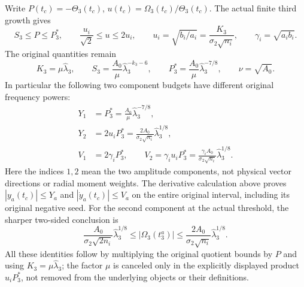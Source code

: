 Write $P(t_c)=-\Theta_3(t_c)$, $u(t_c)=\Omega_3(t_c)/\Theta_3(t_c)$.
The actual finite third growth gives
\[
 S_3\le P\le P_3^*,\qquad
 \frac{u_i}{\sqrt2}\le u\le2u_i,\qquad
 u_i=\sqrt{b_i/a_i}=\frac{K_3}{\sigma_2\sqrt{n_i}},
 \qquad \gamma_i=\sqrt{a_ib_i}.
\]
The original quantities remain
\[
 K_3=\mu\widehat\lambda_3,\qquad
 S_3=\frac{A_0}{\mu}\widehat\lambda_3^{-k_3-6},\qquad
 P_3^*=\frac{A_0}{\mu}\widehat\lambda_3^{-7/8},\qquad
 \nu=\sqrt{A_0}.
\]
In particular the following two component budgets have different
original frequency powers:
\begin{equation}
 \begin{split}
 Y_1&=P_3^*=\frac{A_0}{\mu}\widehat\lambda_3^{-7/8},\\
 Y_2&=2u_iP_3^*
      =\frac{2A_0}{\sigma_2\sqrt{n_i}}\widehat\lambda_3^{1/8},\\
 V_1&=2\gamma_iP_3^*,\qquad
 V_2=\gamma_i u_iP_3^*
      =\frac{\gamma_i A_0}{\sigma_2\sqrt{n_i}}
                       \widehat\lambda_3^{1/8}.
 \end{split}\label{tgq:budgets}
\end{equation}
Here the indices $1,2$ mean the two amplitude components, not physical
vector directions or radial moment weights. The derivative calculation
above proves
$|y_a(t_c)|\le Y_a$ and $|\dot y_a(t_c)|\le V_a$ on the entire
original interval, including its original negative seed.
For the second component at the actual threshold, the sharper two-sided
conclusion is
\[
 \frac{A_0}{\sigma_2\sqrt{2n_i}}\widehat\lambda_3^{1/8}
 \le |\Omega_3(t_3^a)|
 \le \frac{2A_0}{\sigma_2\sqrt{n_i}}\widehat\lambda_3^{1/8}.
\]
All these identities follow by multiplying the original quotient bounds
by $P$ and using $K_3=\mu\widehat\lambda_3$; the factor $\mu$ is
canceled only in the explicitly displayed product $u_iP_3^*$, not
removed from the underlying objects or their definitions.

